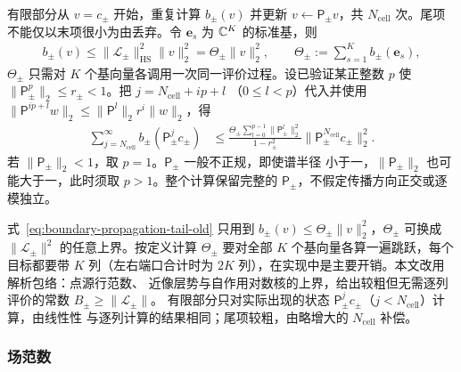 \begin{workonly}
有限部分从 $v=c_\pm$ 开始，重复计算 $b_\pm(v)$ 并更新 $v\leftarrow\mathsf P_\pm v$，共
$N_{\mathrm{cell}}$ 次。尾项不能仅以末项很小为由丢弃。令 $\boldsymbol e_s$ 为 $\mathbb{C}^K$
的标准基，则
\begin{align*}
  b_\pm(v)\leq\lVert\mathcal L_\pm\rVert_{\mathrm{HS}}^2\lVert v\rVert_2^2
  =\Theta_\pm\lVert v\rVert_2^2,
  \qquad\Theta_\pm:=\sum_{s=1}^Kb_\pm(\boldsymbol e_s),
\end{align*}
$\Theta_\pm$ 只需对 $K$ 个基向量各调用一次同一评价过程。设已验证某正整数 $p$ 使
$\lVert\mathsf P_\pm^p\rVert_2\leq r_\pm<1$。把 $j=N_{\mathrm{cell}}+ip+l$
（$0\leq l<p$）代入并使用
$\lVert\mathsf P^{ip+l}w\rVert_2\leq\lVert\mathsf P^l\rVert_2r^i\lVert w\rVert_2$，得
\begin{align}
  \sum_{j=N_{\mathrm{cell}}}^{\infty}b_\pm(\mathsf P_\pm^jc_\pm)
  &\leq\frac{\Theta_\pm\sum_{l=0}^{p-1}\lVert\mathsf P_\pm^l\rVert_2^2}{1-r_\pm^2}
  \bigl\lVert\mathsf P_\pm^{N_{\mathrm{cell}}}c_\pm\bigr\rVert_2^2.
  \label{eq:boundary-propagation-tail-old}
\end{align}
若 $\lVert\mathsf P_\pm\rVert_2<1$，取 $p=1$。$\mathsf P_\pm$ 一般不正规，即使谱半径
小于一，$\lVert\mathsf P_\pm\rVert_2$ 也可能大于一，此时须取 $p>1$。整个计算保留完整的
$\mathsf P_\pm$，不假定传播方向正交或逐模独立。

式~\eqref{eq:boundary-propagation-tail-old} 只用到
$b_\pm(v)\leq\Theta_\pm\lVert v\rVert_2^2$，$\Theta_\pm$ 可换成 $\lVert\mathcal L_\pm\rVert^2$
的任意上界。按定义计算 $\Theta_\pm$ 要对全部 $K$ 个基向量各算一遍跳跃，每个目标都要带
$K$ 列（左右端口合计时为 $2K$ 列），在实现中是主要开销。本文改用解析包络：点源行范数、
近像层势与自作用对数核的上界，给出较粗但无需逐列评价的常数 $B_\pm\geq\lVert\mathcal L_\pm\rVert$。
有限部分只对实际出现的状态 $\mathsf P_\pm^jc_\pm$（$j<N_{\mathrm{cell}}$）计算，由线性性
与逐列计算的结果相同；尾项较粗，由略增大的 $N_{\mathrm{cell}}$ 补偿。
\end{workonly}

\subsubsection{场范数}
\label{subsec:mass}

